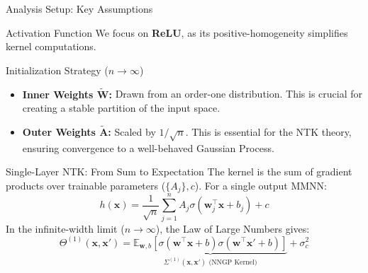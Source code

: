 \documentclass{beamer}
\begin{document}
\begin{frame}{Analysis Setup: Key Assumptions}
\begin{block}{Activation Function}
    We focus on \textbf{ReLU}, as its positive-homogeneity simplifies kernel computations.
\end{block}

\begin{block}{Initialization Strategy ($n \to \infty$)}
\begin{itemize}
    \item \textbf{Inner Weights $\tilde{\bm{W}}$:} Drawn from an order-one distribution. This is crucial for creating a stable partition of the input space.
    \item \textbf{Outer Weights $\tilde{\bm{A}}$:} Scaled by $1/\sqrt{n}$. This is essential for the NTK theory, ensuring convergence to a well-behaved Gaussian Process.
\end{itemize}
\end{block}
\end{frame}

\begin{frame}{Single-Layer NTK: From Sum to Expectation}
The kernel is the sum of gradient products over trainable parameters ($\{A_j\}, c$). For a single output MMNN:
\begin{equation*}
    h(\bm{x}) = \frac{1}{\sqrt{n}} \sum_{j=1}^n A_j \sigma(\bm{w}_j^\top \bm{x} + b_j) + c
\end{equation*}
In the infinite-width limit ($n \to \infty$), the Law of Large Numbers gives:
\begin{equation}
    \Theta^{(1)}(\bm{x}, \bm{x}') = \underbrace{\mathbb{E}_{\bm{w},b} \left[ \sigma(\bm{w}^\top \bm{x} + b)\sigma(\bm{w}^\top \bm{x}' + b) \right]}_{\Sigma^{(1)}(\bm{x}, \bm{x}') \text{ (NNGP Kernel)}} + \sigma_c^2
\end{equation}
\end{frame}
\end{document}
